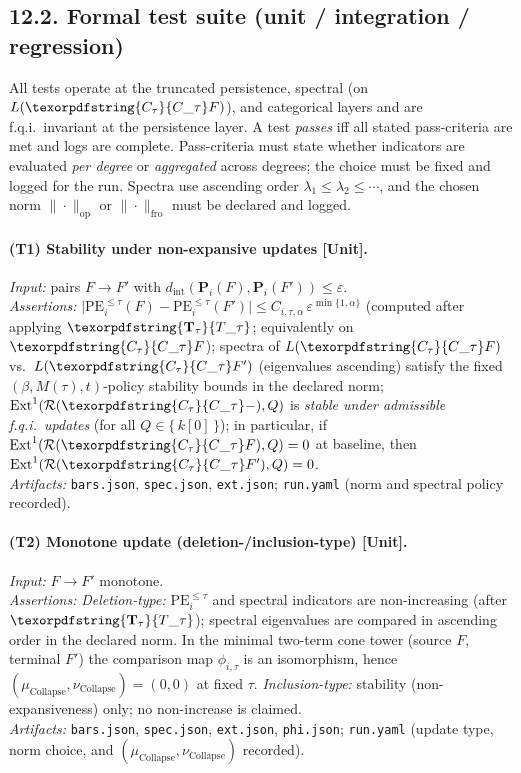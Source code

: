 \documentclass[11pt]{article}
\numberwithin{equation}{section}
\theoremstyle{plain}
\theoremstyle{definition}
\theoremstyle{remark}
\DeclareMathOperator{\Ext}{Ext}
\DeclareRobustCommand{\hyp}{\nobreakdash-}
\newcommand{\Rfun}{\mathcal{R}}
\theoremstyle{plain}
\theoremstyle{definition}
\numberwithin{equation}{section}
\theoremstyle{definition}
\DeclareRobustCommand{\Ttau}{\texorpdfstring{\ensuremath{\mathbf{T}_{\tau}}}{T\_\tau}}
\DeclareRobustCommand{\Ctau}{\texorpdfstring{\ensuremath{C_{\tau}}}{C\_\tau}}
\DeclareRobustCommand{\muc}{\mu_{\mathrm{Collapse}}}
\DeclareRobustCommand{\nuc}{\nu_{\mathrm{Collapse}}}
\DeclareRobustCommand{\Qtest}{\{\,k[0]\,\}}
\numberwithin{equation}{section}
\theoremstyle{plain}
\theoremstyle{definition}
\theoremstyle{remark}
\providecommand{\Cfun}[1]{\mathsf{C}_{#1}}
\providecommand{\Tfun}[1]{\mathbf{T}_{#1}}
\providecommand{\Ctau}{\Cfun{\tau}}
\providecommand{\Ttau}{\Tfun{\tau}}
\providecommand{\muc}{\mu_{\mathrm{Collapse}}}
\providecommand{\nuc}{\nu_{\mathrm{Collapse}}}
\providecommand{\n}{\unskip\space}
\begin{document}
\subsection*{12.2. Formal test suite (unit / integration / regression)}
All tests operate at the truncated persistence, spectral (on \(L(\Ctau F)\)), and categorical layers and are f.q.i.\ invariant at the persistence layer. A test \emph{passes} iff all stated pass\hyp criteria are met and logs are complete. Pass\hyp criteria must state whether indicators are evaluated \emph{per degree} or \emph{aggregated} across degrees; the choice must be fixed and logged for the run. Spectra use ascending order \(\lambda_1\le\lambda_2\le\cdots\), and the chosen norm \(\|\cdot\|_{\mathrm{op}}\) or \(\|\cdot\|_{\mathrm{fro}}\) must be declared and logged.

\paragraph{(T1) Stability under non\hyp expansive updates [Unit].}
\emph{Input:} pairs \(F\to F'\) with \(d_{\mathrm{int}}(\mathbf{P}_i(F),\mathbf{P}_i(F'))\le \varepsilon\).\\\n\emph{Assertions:} \(\big|\mathrm{PE}^{\le\tau}_i(F)-\mathrm{PE}^{\le\tau}_i(F')\big|\le C_{i,\tau,\alpha}\,\varepsilon^{\min\{1,\alpha\}}\) (computed after applying \(\Ttau\); equivalently on \(\Ctau F\)); spectra of \(L(\Ctau F)\) vs.\ \(L(\Ctau F')\) (eigenvalues ascending) satisfy the fixed \((\beta,M(\tau),t)\)\hyp policy stability bounds in the declared norm; \(\Ext^1(\Rfun(\Ctau-),Q)\) is \emph{stable under admissible f.q.i.\ updates} (for all \(Q\in\Qtest\)); in particular, if \(\Ext^1(\Rfun(\Ctau F),Q)=0\) at baseline, then \(\Ext^1(\Rfun(\Ctau F'),Q)=0\).\\\n\emph{Artifacts:} \texttt{bars.json}, \texttt{spec.json}, \texttt{ext.json}; \texttt{run.yaml} (norm and spectral policy recorded).

\paragraph{(T2) Monotone update (deletion\hyp /inclusion\hyp type) [Unit].}
\emph{Input:} \(F\to F'\) monotone.\\\n\emph{Assertions:} \emph{Deletion\hyp type:} \(\mathrm{PE}^{\le\tau}_i\) and spectral indicators are non\hyp increasing (after \(\Ttau\)); spectral eigenvalues are compared in ascending order in the declared norm. In the minimal two\hyp term cone tower (source \(F\), terminal \(F'\)) the comparison map \(\phi_{i,\tau}\) is an isomorphism, hence \((\muc,\nuc)=(0,0)\) at fixed \(\tau\).
\emph{Inclusion\hyp type:} stability (non\hyp expansiveness) only; no non\hyp increase is claimed.\\\n\emph{Artifacts:} \texttt{bars.json}, \texttt{spec.json}, \texttt{ext.json}, \texttt{phi.json}; \texttt{run.yaml} (update type, norm choice, and \((\muc,\nuc)\) recorded).
\end{document}

